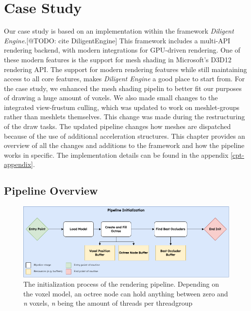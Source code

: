 \chapter{Case Study} \label{cpt-case-study}

Our case study is based on an implementation within the framework \emph{Diligent Engine}.[@TODO: cite DiligentEngine]
This framework includes a multi-\ac{API} rendering backend, with modern integrations for \ac{GPU}-driven rendering.
One of these modern features is the support for mesh shading in Microsoft's D3D12 rendering \ac{API}. 
The support for modern rendering features while still maintaining access to all core features, makes 
\emph{Diligent Engine} a good place to start from. For the case study, we enhanced the mesh shading pipelin 
to better fit our purposes of drawing a huge amount of voxels. We also made small changes to the integrated 
view-frustum culling, which was updated to work on meshlet-groups rather than meshlets themselves. This change 
was made during the restructuring of the draw tasks. The updated pipeline changes how meshes are dispatched 
because of the use of additional acceleration structures. This chapter provides an overview of all the changes and 
additions to the framework and how the pipeline works in specific. The implementation details can be found in the 
appendix \ref{cpt-appendix}.

\section{Pipeline Overview}

\begin{figure}[h]
    \centering
    \includegraphics[width=\linewidth]{images/graphics/pipeline-initialization.png}
    \caption{The initialization process of the rendering pipeline. Depending on the voxel model, an octree node 
    can hold anything between zero and \emph{n} voxels, \emph{n} being the amount of threads per threadgroup}
    \label{fig:pipeline-initialization}
\end{figure}

